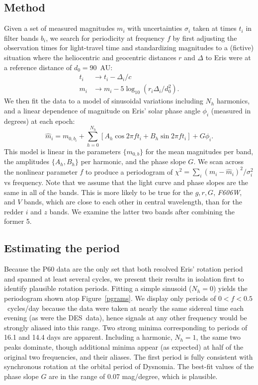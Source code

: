\documentclass[onecolumn]{aastex631}
\newcommand{\des}{DES}
\begin{document}
\subsection{Method}
Given a set of measured magnitudes $m_i$ with uncertainties $\sigma_i$ taken at times $t_i$ in filter bands $b_i$, we search for periodicity at frequency $f$ by first adjusting the observation times for light-travel time and standardizing magnitudes to a (fictive) situation where the heliocentric and geocentric distances $r$ and $\Delta$ to Eris were at a reference distance of $d_0=90$~AU:
\begin{align}
  t_i & \rightarrow t_i - \Delta_i/c \\
  m_i & \rightarrow m_i - 5 \log_{10}(r_i \Delta_i / d_0^2).
\end{align}
We then fit the data to a model of sinusoidal variations including $N_h$ harmonics, and a linear dependence of magnitude on Eris' solar phase angle $\phi_i$ (measured in degrees) at each epoch:
\begin{equation}
  \hat m_i = m_{0, b_i} + \sum_{h=0}^{N_h} \left[ A_h \cos 2\pi ft_i  + B_h \sin 2\pi f t_i\right] +  G\phi_i.
  \label{model}
\end{equation}
This model is linear in the parameters $\{m_{0,b}\}$ for the mean magnitudes per band, the amplitudes $\{A_h, B_h\}$ per harmonic, and the phase slope $G.$  We scan across the nonlinear parameter $f$ to produce a periodogram of $\chi^2=\sum_i (m_i-\hat m_i)^2/\sigma_i^2$ vs frequency. Note that we assume that the light curve and phase slopes are the same in all of the bands. This is more likely to be true for the $g, r, G$, {\it F606W}, and $V$ bands, which are close to each other in central wavelength, than for the redder $i$ and $z$ bands. We examine the latter two bands after combining the former 5.

\subsection{Estimating the period}
Because the P60 data are the only set that both resolved Eris' rotation period and spanned at least several cycles, we present their results in isolation first to identify plausible rotation periods. Fitting a simple sinusoid ($N_h=0$) yields the periodogram shown atop Figure~\ref{pgrams}. We display only periods of $0<f<0.5$~cycles/day because the data were taken at nearly the same sidereal time each evening (as were the \des\ data), hence signals at any other frequency would be strongly aliased into this range. Two strong minima corresponding to periods of 16.1 and 14.4 days are apparent. Including a harmonic, $N_h=1$, the same two peaks dominate, though additional minima appear (as expected) at half of the original two frequencies, and their aliases. The first period is fully consistent with synchronous rotation at the orbital period of Dysnomia. The best-fit values of the phase slope $G$ are in the range of 0.07 mag/degree, which is plausible.
\end{document}
